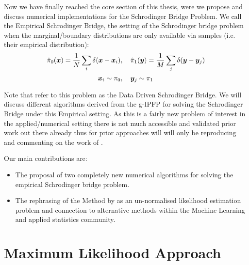 \documentclass[a4paper,12pt,twoside,openright]{report}
\theoremstyle{definition}
\begin{document}
Now we have finally reached the core section of this thesis, were we propose and discuss numerical implementations for the Schrodinger Bridge Problem. We call the Empirical Schrodinger Bridge, the setting of the Schrodinger bridge problem when the marginal/boundary distributions are only available via samples (i.e. their empirical distribution):
\begin{align}
    \hat{\pi}_0({\bm{x}})  = \frac{1}{N}\sum_i \delta({\bm{x}} -{\bm{x}}_i) &, \quad\hat{\pi}_1({\bm{y}})  = \frac{1}{M}\sum_j \delta({\bm{y}} -{\bm{y}}_j) \nonumber\\
    {\bm{x}}_i \sim \pi_0 &, \quad {\bm{y}}_j \sim \pi_1
\end{align}

Note that \cite{pavon2018data} refer to this problem as the Data Driven Schrodinger Bridge. We will discuss  different algorithms derived from the g-IPFP for solving the Schrodinger Bridge under this Empirical setting. As this is a fairly new problem of interest in the applied/numerical setting there is not much accessible and validated prior work out there already thus for prior approaches will will only be reproducing and commenting on the work of \cite{pavon2018data}.

Our main contributions are:

\begin{itemize}
    \item The proposal of two completely new numerical algorithms for solving the empirical Schrodinger bridge problem.
    \item The rephrasing of the Method by \cite{pavon2018data} as an un-normalised likelihood estimation problem and connection to alternative methods within the Machine Learning and applied statistics community.
\end{itemize}



\section{Maximum Likelihood Approach \citep{pavon2018data}}
\end{document}
